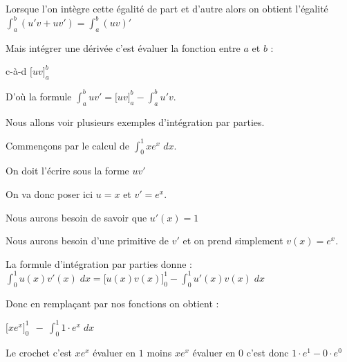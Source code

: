 Lorsque l'on intègre cette égalité de part et d'autre alors on obtient l'égalité 
$\int_a^b (u'v+uv')=\int_a^b (uv)'$

\change

Mais intégrer une dérivée c'est évaluer la fonction entre $a$ et $b$ :

c-à-d $\big[uv\big]_a^b$

\change

D'où la formule $\int_a^b uv'= \big[uv\big]_a^b - \int_a^b u'v$.



\diapo

% 
% 
% 

Nous allons voir plusieurs exemples d'intégration par parties.

\change

Commençons par le calcul de $\int_0^1 x e^x \; dx$.

\change

On doit l'écrire sous la forme $uv'$

\change

On va donc poser ici $u=x$ et $v'=e^x$.

\change


Nous aurons besoin de savoir que $u'(x)=1$ 

\change

Nous aurons besoin d'une primitive de $v'$ 
et on prend simplement $v(x)=e^x$.

\change


La formule d'intégration par parties donne :
$\int_0^1 u(x)v'(x)\;dx  =  \big[u(x)v(x)\big]_0^1 - \int_0^1 u'(x)v(x)\;dx$

\change

Donc en remplaçant par nos fonctions on obtient :

$\big[x e^x\big]_0^1 \ \  - \  \int_0^1 1\cdot e^x \;dx$

\change

Le crochet c'est  $x e^x$ évaluer en $1$ moins $xe^x$ évaluer en $0$ c'est donc 
$1\cdot e^1-0\cdot e^0$

\change

